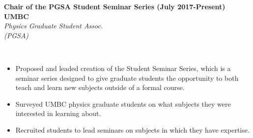 \documentclass{article}
\begin{document}
%
%
%
%
\begin{vwcol}[widths={0.8,0.2}, sep=.8cm, justify=flush, rule=0pt, indent=0em]
\noindent \textbf{Chair of the PGSA Student Seminar Series (July 2017-Present)}
\newpage
\noindent \textbf{UMBC}\\
\noindent \emph{Physics Graduate Student Assoc.}\\
\noindent \emph{(PGSA)}
\end{vwcol}
\phantom \\
\begin{itemize}
\item Proposed and leaded creation of the Student Seminar Series, which is a seminar series designed to give graduate students the opportunity to both teach and learn new subjects outside of a formal course.
\item Surveyed UMBC physics graduate students on what subjects they were interested in learning about.
\item Recruited students to lead seminars on subjects in which they have expertise.
\end{itemize}
\phantom \\
\phantom\\
%
%
%
%
\par
\phantom \\
\phantom \\
\end{document}
